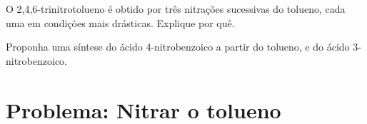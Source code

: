 \begin{exercise}[$\star\star\star$]\label{exo:b2:aromatic-substitution:11}
O 2,4,6-trinitrotolueno é obtido por três nitrações sucessivas do tolueno,
cada uma em condições mais drásticas. Explique por quê.
\end{exercise}

\begin{exercise}[$\star\star\star$]\label{exo:b2:aromatic-substitution:12}
Proponha uma síntese do ácido 4-nitrobenzoico a partir do tolueno, e do ácido 3-nitrobenzoico.
\end{exercise}

\section{Problema: Nitrar o tolueno}


